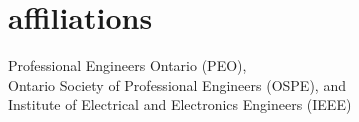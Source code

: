 
\section{affiliations}
  \vspace{-0.2cm}

Professional Engineers Ontario (PEO),\\Ontario Society of Professional Engineers (OSPE), and\\Institute of Electrical and Electronics Engineers (IEEE)